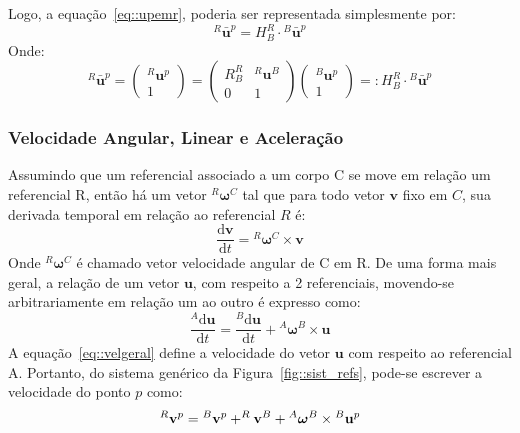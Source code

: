 Logo, a equação~\ref{eq::upemr}, poderia ser representada simplesmente por:
%
\begin{equation}
	^R\bar{\mathbf{u}}^p = H_B^R \cdot {^B}\bar{\mathbf{u}}^p
\end{equation}
%
Onde:
%
\begin{equation}
	^R\bar{\mathbf{u}}^p = \begin{pmatrix}
^R\mathbf{u}^p\\ 
1
\end{pmatrix}
=
\begin{pmatrix}
R_B^R & {^R}\mathbf{u}^B\\ 
0 & 1
\end{pmatrix}
\begin{pmatrix}
^B\mathbf{u}^{p}\\ 
1
\end{pmatrix} =: H_B^R \cdot {^B}\bar{\mathbf{u}}^{p}
\end{equation}


\subsubsection{Velocidade Angular, Linear e Aceleração}

Assumindo que um referencial associado a um corpo C se move em relação
um referencial R, então há um vetor $^{R}\boldsymbol{\omega}^{C}$ tal que para
todo vetor $\mathbf{v}$ fixo em $C$, sua derivada temporal em relação ao
referencial $R$ é:
%
\begin{equation}
	\frac{\mathrm{d} \mathbf{v}}{\mathrm{d} t} = {}^{R}\boldsymbol{\omega}^{C}
	\times \mathbf{v}
\end{equation}
%
Onde ${}^{R}\boldsymbol{\omega}^{C}$ é chamado vetor velocidade angular
de C em R.
De uma forma mais geral, a relação de um vetor $\mathbf{u}$, com respeito a 2
referenciais, movendo-se arbitrariamente em relação um ao outro é expresso como:
%
\begin{equation} \label{eq::velgeral}
	\frac{^{A}\mathrm{d} \mathbf{u}}{\mathrm{d} t} = \frac{^{B}\mathrm{d}
	\mathbf{u}}{\mathrm{d} t} + {}^{A}\boldsymbol{\omega}^{B} \times \mathbf{u}
\end{equation}
%
A equação~\ref{eq::velgeral} define a velocidade do vetor $\mathbf{u}$ com
respeito ao referencial A. Portanto, do sistema genérico da
Figura~\ref{fig::sist_refs}, pode-se escrever a velocidade do ponto $p$ como:
%
\begin{equation}
	^{R}\mathbf{v}^{p} = {}^{B}\mathbf{v}^{p} + ^{R}\mathbf{v}^{B} +
	{}^{A}\boldsymbol{\omega}^{B} \times {}^{B}\textrm{\textbf{u}}^{p}
\end{equation}
%

